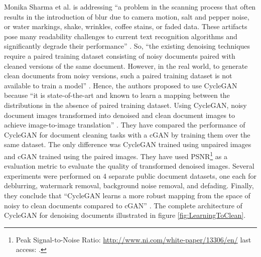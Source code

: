 Monika Sharma et al.\cite{sharma2019learning} is addressing ``a problem in the scanning process that often results in the introduction of blur due to camera motion, salt and pepper noise, or water markings, shake, wrinkles, coffee stains, or faded data. These artifacts pose many readability challenges to current text recognition algorithms and significantly degrade their performance'' \cite{sharma2019learning}. So, ``the existing denoising techniques require a paired training dataset consisting of noisy documents paired with cleaned versions of the same document. However, in the real world, to generate clean documents from noisy versions, such a paired training dataset is not available to train a model'' \cite{sharma2019learning}. Hence, the authors proposed to use \ac{CycleGAN} because ``it is state-of-the-art and known to learn a mapping between the distributions in the absence of paired training dataset. Using \ac{CycleGAN}, noisy document images transformed into denoised and clean document images to achieve image-to-image translation'' \cite{sharma2019learning}. They have compared the performance of \ac{CycleGAN} for document cleaning tasks with a \ac{cGAN} by training them over the same dataset. The only difference was \ac{CycleGAN} trained using unpaired images and \ac{cGAN} trained using the paired images. They have used \ac{PSNR}\footnote{Peak Signal-to-Noise Ratio: \url{http://www.ni.com/white-paper/13306/en/} last access: \dcdate.} as a evaluation metric to evaluate the quality of transformed denoised images. Several experiments were performed on 4 separate public document datasets, one each for deblurring, watermark removal, background noise removal, and defading. Finally, they conclude that ``\ac{CycleGAN} learns a more robust mapping from the space of noisy to clean documents compared to \ac{cGAN}'' \cite{sharma2019learning}. The complete architecture of \ac{CycleGAN} for denoising documents illustrated in figure \ref{fig:LearningToClean}.


